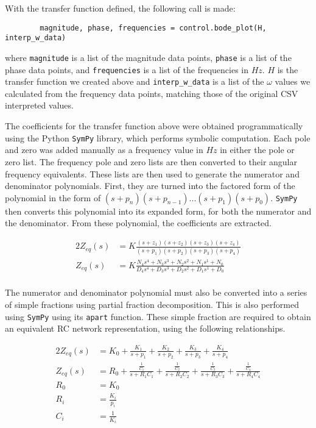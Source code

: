 \documentclass[10pt, oneside, letterpaper]{article}
\begin{document}
With the transfer function defined, the following call is made:

\begin{lstlisting}
        magnitude, phase, frequencies = control.bode_plot(H, interp_w_data)
\end{lstlisting}

where \texttt{magnitude} is a list of the magnitude data points, \texttt{phase} is a list of the phase data points, and \texttt{frequencies} is a list of the frequencies in $Hz$. $H$ is the transfer function we created above and \texttt{interp\_w\_data} is a list of the $\omega{}$ values we calculated from the frequency data points, matching those of the original CSV interpreted values.

The coefficients for the transfer function above were obtained programmatically using the Python \texttt{SymPy} library, which performs symbolic computation. Each pole and zero was added manually as a frequency value in $Hz$ in either the pole or zero list. The frequency pole and zero lists are then converted to their angular frequency equivalents. These lists are then used to generate the numerator and denominator polynomials. First, they are turned into the factored form of the polynomial in the form of $(s + p_n)(s + p_{n-1})...(s + p_1)(s + p_0)$. \texttt{SymPy} then converts this polynomial into its expanded form, for both the numerator and the denominator. From these polynomial, the coefficients are extracted.

\begin{alignat}{2}
Z_{eq}(s) &= K\frac{(s + z_1)(s + z_2)(s + z_3)(s + z_4)}{(s + p_1)(s + p_2)(s + p_3)(s + p_4)} \\
Z_{eq}(s) &= K\frac{N_4s^4 + N_3s^3 + N_2s^2 + N_1s^1 + N_0}{D_4s^4 + D_3s^3 + D_2s^2 + D_1s^1 + D_0} \\
\end{alignat}

The numerator and denominator polynomial must also be converted into a series of simple fractions using partial fraction decomposition. This is also performed using \texttt{SymPy} using its \texttt{apart} function. These simple fraction are required to obtain an equivalent RC network representation, using the following relationships.

\begin{alignat}{2}
Z_{eq}(s) &= K_0 + \frac{K_1}{s + p_1} + \frac{K_2}{s + p_2} + \frac{K_3}{s + p_3} + \frac{K_4}{s + p_4} \\
Z_{eq}(s) &= R_0 + \frac{\frac{1}{C_1}}{s + R_1C_1} + \frac{\frac{1}{C_2}}{s + R_2C_2} + \frac{\frac{1}{C_3}}{s + R_3C_3} + \frac{\frac{1}{C_4}}{s + R_4C_4} \\
R_0 &= K_0 \\
R_i &= \frac{K_i}{p_i} \\
C_i &= \frac{1}{K_i}
\end{alignat}
\end{document}
